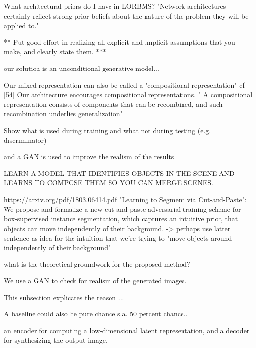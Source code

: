 \documentclass[12pt,a4paper]{article}
\begin{document}
\par What architectural priors do I have in LORBMS? "Network architectures certainly reflect strong prior beliefs about the nature of the problem they will be applied to."

\par ***
Put good effort in realizing
all explicit and implicit assumptions that you make, and
clearly state them.
***

\par our solution is an unconditional generative model...

\par Our mixed representation can also be called a "compositional representation" cf [54] Our architecture encourages compositional representations. " A compositional representation consists
of components that can be recombined, and such recombination underlies generalization"

\par Show what is used during training and what not during testing (e.g. discriminator)

\par and a GAN is used to improve the realism of the results

\par LEARN A MODEL THAT IDENTIFIES OBJECTS IN THE SCENE AND LEARNS TO COMPOSE THEM SO YOU CAN MERGE SCENES.

\par https://arxiv.org/pdf/1803.06414.pdf "Learning to Segment via Cut-and-Paste": We propose and formalize a new cut-and-paste adversarial training scheme for box-supervised instance segmentation, which captures an intuitive prior, that objects can move independently of their background.
-> perhaps use latter sentence as idea for the intuition that we're trying to "move objects around independently of their background"

\par what is the theoretical groundwork for the proposed method?

\par We use a GAN to check for realism of the generated images.

\par This subsection explicates the reason ...

\par A baseline could also be pure chance s.a. 50 percent chance..

\par an encoder for computing a low-dimensional latent representation, and a decoder for synthesizing the output image.
\end{document}
